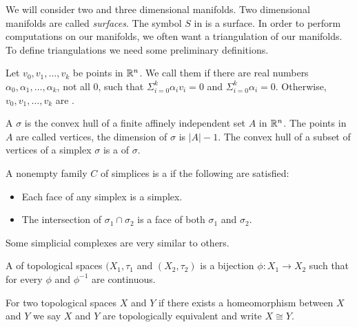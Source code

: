 We will  consider two and three dimensional manifolds. Two dimensional
manifolds are called \emph{surfaces}.
The symbol $S$ in  is a surface.
In order to perform computations on our manifolds, 
we often want a triangulation of our manifolds.
To define triangulations we need some preliminary definitions.



\begin{definition}
Let $v_0,v_1,\ldots,v_k$ be points in $\mathbb{R}^n$. We call them 
if there are real numbers $\alpha_0,\alpha_1,\ldots,\alpha_k$, not all 0, such that
$\Sigma_{i=0}^k \alpha_iv_i=0$ and $\Sigma_{i=0}^k \alpha_i=0.$
Otherwise,  $v_0,v_1,\ldots,v_k$ are .

\end{definition}

\begin{definition}[Simplices]
A  $\sigma$ is the convex hull of a finite affinely independent
set $A$ in $\mathbb{R}^n$. The points in  $A$ are  called vertices, the dimension
of  $\sigma$ is $|A|-1$.  The convex hull of a subset of vertices of a simplex
$\sigma$ is a  of $\sigma$.
\end{definition}

\begin{definition}
A nonempty family $C$ of simplices is a  if the following
are satisfied:
\begin{itemize}
\item  Each face of any simplex is a simplex.
\item The intersection of $\sigma_1 \cap \sigma_2$ is a face of both $\sigma_1$ and 
$\sigma_2$.
\end{itemize}


\end{definition}

Some simplicial complexes are very similar to others.


\begin{definition}[Homeomorphism]
A    of topological spaces $(X_1,\tau_1$ and $(X_2,\tau_2)$
is a bijection $\phi:X_1\to X_2$ such that for every $\phi$ and $\phi^{-1}$ are continuous.
\end{definition}
For two topological spaces $X$ and $Y$ if there exists a  homeomorphism between
$X$ and $Y$ we say $X$ and $Y$ are topologically  equivalent and write  $X\cong Y.$

